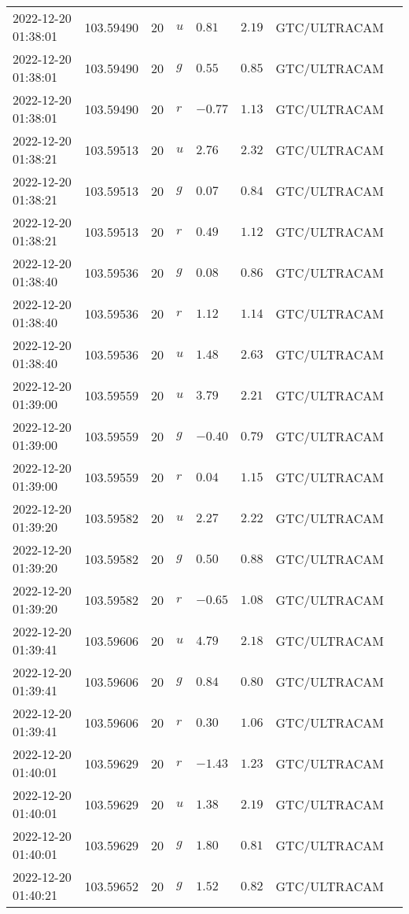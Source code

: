 \documentclass{nature_plusfigure}
\begin{document}
\begin{supplement}
\begin{center}
\begin{longtable}{llllllll}
2022-12-20 01:38:01 & 103.59490 & 20 & $u$ & $0.81$ & $2.19$ & GTC/ULTRACAM &  \\ 
2022-12-20 01:38:01 & 103.59490 & 20 & $g$ & $0.55$ & $0.85$ & GTC/ULTRACAM &  \\ 
2022-12-20 01:38:01 & 103.59490 & 20 & $r$ & $-0.77$ & $1.13$ & GTC/ULTRACAM &  \\ 
2022-12-20 01:38:21 & 103.59513 & 20 & $u$ & $2.76$ & $2.32$ & GTC/ULTRACAM &  \\ 
2022-12-20 01:38:21 & 103.59513 & 20 & $g$ & $0.07$ & $0.84$ & GTC/ULTRACAM &  \\ 
2022-12-20 01:38:21 & 103.59513 & 20 & $r$ & $0.49$ & $1.12$ & GTC/ULTRACAM &  \\ 
2022-12-20 01:38:40 & 103.59536 & 20 & $g$ & $0.08$ & $0.86$ & GTC/ULTRACAM &  \\ 
2022-12-20 01:38:40 & 103.59536 & 20 & $r$ & $1.12$ & $1.14$ & GTC/ULTRACAM &  \\ 
2022-12-20 01:38:40 & 103.59536 & 20 & $u$ & $1.48$ & $2.63$ & GTC/ULTRACAM &  \\ 
2022-12-20 01:39:00 & 103.59559 & 20 & $u$ & $3.79$ & $2.21$ & GTC/ULTRACAM &  \\ 
2022-12-20 01:39:00 & 103.59559 & 20 & $g$ & $-0.40$ & $0.79$ & GTC/ULTRACAM &  \\ 
2022-12-20 01:39:00 & 103.59559 & 20 & $r$ & $0.04$ & $1.15$ & GTC/ULTRACAM &  \\ 
2022-12-20 01:39:20 & 103.59582 & 20 & $u$ & $2.27$ & $2.22$ & GTC/ULTRACAM &  \\ 
2022-12-20 01:39:20 & 103.59582 & 20 & $g$ & $0.50$ & $0.88$ & GTC/ULTRACAM &  \\ 
2022-12-20 01:39:20 & 103.59582 & 20 & $r$ & $-0.65$ & $1.08$ & GTC/ULTRACAM &  \\ 
2022-12-20 01:39:41 & 103.59606 & 20 & $u$ & $4.79$ & $2.18$ & GTC/ULTRACAM &  \\ 
2022-12-20 01:39:41 & 103.59606 & 20 & $g$ & $0.84$ & $0.80$ & GTC/ULTRACAM &  \\ 
2022-12-20 01:39:41 & 103.59606 & 20 & $r$ & $0.30$ & $1.06$ & GTC/ULTRACAM &  \\ 
2022-12-20 01:40:01 & 103.59629 & 20 & $r$ & $-1.43$ & $1.23$ & GTC/ULTRACAM &  \\ 
2022-12-20 01:40:01 & 103.59629 & 20 & $u$ & $1.38$ & $2.19$ & GTC/ULTRACAM &  \\ 
2022-12-20 01:40:01 & 103.59629 & 20 & $g$ & $1.80$ & $0.81$ & GTC/ULTRACAM &  \\ 
2022-12-20 01:40:21 & 103.59652 & 20 & $g$ & $1.52$ & $0.82$ & GTC/ULTRACAM &  \\ 

\end{longtable}
\end{center}
\end{supplement}
\end{document}
